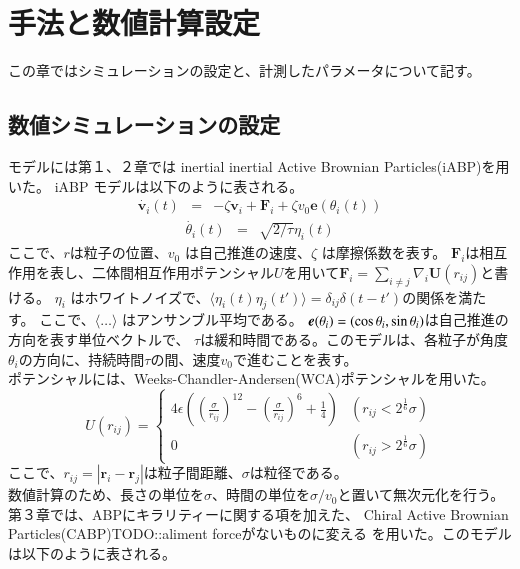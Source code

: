 \documentclass[/Users/ikedahajime/GitHub/reserch/master_report/thesis]{subfiles}
\begin{document}
\chapter{手法と数値計算設定}
この章ではシミュレーションの設定と、計測したパラメータについて記す。
\section{数値シミュレーションの設定}
モデルには第１、２章では inertial inertial Active Brownian Particles(iABP)を用いた。 iABP モデルは以下のように表される。
\begin{eqnarray}
    \dot{\bm{v}_i}(t)&=& - \zeta \bm{v}_i  +\bm{F}_i +\zeta v_0 \bm{e}(\theta_i(t))
\end{eqnarray}
\begin{eqnarray}
    \dot{\theta_i }(t) &=& \sqrt{2/\tau}\eta_i(t)
\end{eqnarray}
ここで、\mbox{\boldmath$r$}は粒子の位置、$v_0$ は自己推進の速度、$\zeta$ は摩擦係数を表す。
$\bm{F}_i$は相互作用を表し、二体間相互作用ポテンシャル$U$を用いて$\bm{F}_i=\sum_{i\neq j} \nabla_i\bm{U}(r_{ij})$と書ける。
$\eta_i$ はホワイトノイズで、$\langle \eta_i(t) \eta_j(t') \rangle=\delta_{ij}\delta(t-t')$の関係を満たす。
ここで、$\langle \dots \rangle$ はアンサンブル平均である。
$\mbox{\boldmath$e$}(\theta_i)=(\cos\theta_i,\sin \theta_i)$は自己推進の方向を表す単位ベクトルで、
$\tau$は緩和時間である。このモデルは、各粒子が角度$\theta_i$の方向に、持続時間$\tau$の間、速度$v_0$で進むことを表す。\\
ポテンシャルには、Weeks-Chandler-Andersen(WCA)ポテンシャル\cite{weeksRoleRepulsiveForces1971}を用いた。
\begin{equation}
    U(r_{ij})=
    \begin{cases}
        4\epsilon\left(\left(\frac{\sigma}{r_{ij}}\right)^{12}-\left(\frac{\sigma}{r_{ij}}\right)^6+\frac{1}{4}\right) & (r_{ij}<2^{\frac{1}{6}}\sigma)\\
        0 &(r_{ij}>2^{\frac{1}{6}}\sigma)
    \end{cases}
\end{equation}
ここで、$r_{ij}=\left|\bm{r}_i-\bm{r}_j\right|$は粒子間距離、$\sigma$は粒径である。\\
数値計算のため、長さの単位を$\sigma$、時間の単位を$\sigma/v_0$と置いて無次元化を行う。
第３章では、ABPにキラリティーに関する項を加えた、 Chiral Active Brownian Particles(CABP)\cite{teeffelenDynamicsBrownianCircle2008}TODO::aliment forceがないものに変える を用いた。このモデルは以下のように表される。
\end{document}

